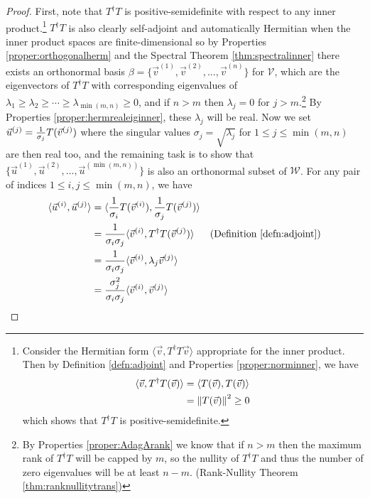 \begin{proof}
First, note that $T^\dag T$ is positive-semidefinite with respect to any inner product.\footnote{\label{foot:TdagTpossemidef} Consider the Hermitian form $\langle \vec{v}, T^\dag T \vec{v} \rangle$ appropriate for the inner product. Then by Definition \ref{defn:adjoint} and Properties \ref{proper:norminner}, we have
\begin{align*}
\langle \vec{v}, T^\dag T (\vec{v}) \rangle &= \langle T (\vec{v}), T (\vec{v}) \rangle \\
&= \norm{T(\vec{v})}^2 \geq 0
\end{align*}
which shows that $T^\dag T$ is positive-semidefinite.} $T^\dag T$ is also clearly self-adjoint and automatically Hermitian when the inner product spaces are finite-dimensional so by Properties \ref{proper:orthogonalherm} and the Spectral Theorem \ref{thm:spectralinner} there exists an orthonormal basis $\beta = \{\vec{v}^{(1)}, \vec{v}^{(2)}, \ldots, \vec{v}^{(n)}\}$ for $\mathcal{V}$, which are the eigenvectors of $T^\dag T$ with corresponding eigenvalues of $\lambda_1 \geq \lambda_2 \geq \cdots \geq \lambda_{\min(m,n)} \geq 0$, and if $n > m$ then $\lambda_{j} = 0$ for $j > m$.\footnote{\label{foot:zerosingular} By Properties \ref{proper:AdagArank} we know that if $n > m$ then the maximum rank of $T^\dag T$ will be capped by $m$, so the nullity of $T^\dag T$ and thus the number of zero eigenvalues will be at least $n-m$. (Rank-Nullity Theorem \ref{thm:ranknullitytrans})} By Properties \ref{proper:hermrealeiginner}, these $\lambda_j$ will be real. Now we set $\vec{u}^{(j)} = \smash{\frac{1}{\sigma_j}T(\vec{v}^{(j)})}$ where the singular values $\sigma_j = \sqrt{\lambda_j}$ for $1 \leq j \leq \min(m,n)$ are then real too, and the remaining task is to show that $\{\vec{u}^{(1)}, \vec{u}^{(2)},\ldots,\vec{u}^{(\min(m,n))}\}$ is also an orthonormal subset of $\mathcal{W}$. For any pair of indices $1 \leq i,j \leq \min(m,n)$, we have
\begin{align}
\langle \vec{u}^{(i)}, \vec{u}^{(j)} \rangle &= \langle \frac{1}{\sigma_i}T(\vec{v}^{(i)}), \frac{1}{\sigma_j}T(\vec{v}^{(j)}) \rangle \nonumber \\
&= \frac{1}{\sigma_i \sigma_j}\langle \vec{v}^{(i)}, T^\dag T(\vec{v}^{(j)}) \rangle & \text{(Definition \ref{defn:adjoint})} \nonumber \\
&= \frac{1}{\sigma_i \sigma_j}\langle \vec{v}^{(i)}, \lambda_j\vec{v}^{(j)} \rangle \nonumber \\
&= \frac{\sigma_j^2}{\sigma_i \sigma_j}\langle \vec{v}^{(i)}, \vec{v}^{(j)} \rangle \nonumber \\

\end{align}
\end{proof}
